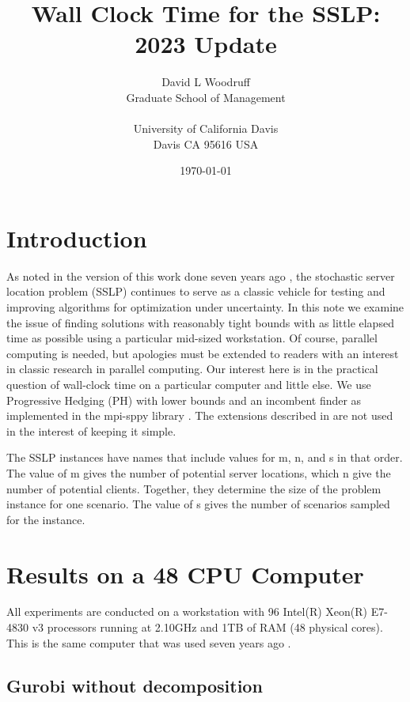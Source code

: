 \documentclass{article}
\title{Wall Clock Time for the SSLP: 2023 Update}
\author{  David L Woodruff\\
  Graduate School of Management\\
  \\
  University of California Davis\\
  Davis CA 95616 USA}
\date{\today}
\begin{document}
\maketitle


\section{Introduction}

As noted in the version of this work done seven years ago \cite{sslpfortime}, the stochastic server location problem (SSLP) \cite{sslp} continues to serve as a classic vehicle
for testing and improving algorithms for optimization under uncertainty. In this note we
examine the issue of finding solutions with reasonably tight bounds with as little elapsed
time as possible using a particular mid-sized workstation. Of course, parallel computing is needed, but apologies must be extended
to readers with an interest in classic research in parallel computing. Our interest here is
in the practical question of wall-clock time on a particular computer and little else.
We use Progressive Hedging (PH) \cite{ph} with lower bounds \cite{gadeetal16} 
and an incombent finder as implemented in the mpi-sppy library \cite{mpi-sppy}.
 The extensions described in \cite{WW} are not used in the interest of keeping it simple.

The SSLP instances have names that include values for m, n, and s in that order. The value
of m gives the number of potential server locations, which n give the number of potential
clients. Together, they determine the size of the problem instance for one scenario. The
value of s gives the number of scenarios sampled for the instance.

\section{Results on a 48 CPU Computer}

All experiments are conducted on a workstation with 96 Intel(R) Xeon(R) E7-4830 v3 processors running at 2.10GHz
and 1TB of RAM (48 physical cores).  This is the same computer that was used seven years ago \cite{sslpfortime}.

\subsection{Gurobi without decomposition}
\end{document}
